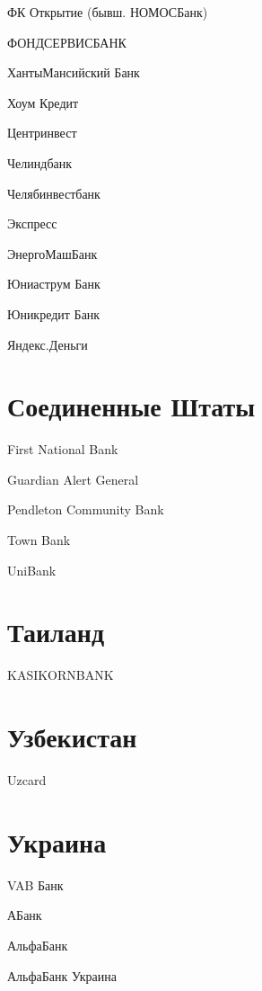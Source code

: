 \documentclass[a4paper,10pt,russian]{sphinxmanual}
\begin{document}
\sphinxAtStartPar
ФК Открытие (бывш. НОМОС\sphinxhyphen{}Банк)

\sphinxAtStartPar
ФОНДСЕРВИСБАНК

\sphinxAtStartPar
Ханты\sphinxhyphen{}Мансийский Банк

\sphinxAtStartPar
Хоум Кредит

\sphinxAtStartPar
Центр\sphinxhyphen{}инвест

\sphinxAtStartPar
Челиндбанк

\sphinxAtStartPar
Челябинвестбанк

\sphinxAtStartPar
Экспресс

\sphinxAtStartPar
ЭнергоМашБанк

\sphinxAtStartPar
Юниаструм Банк

\sphinxAtStartPar
Юникредит Банк

\sphinxAtStartPar
Яндекс.Деньги


\section{Соединенные Штаты}
\label{\detokenize{banks:id12}}
\sphinxAtStartPar
First National Bank

\sphinxAtStartPar
Guardian Alert General

\sphinxAtStartPar
Pendleton Community Bank

\sphinxAtStartPar
Town Bank

\sphinxAtStartPar
UniBank


\section{Таиланд}
\label{\detokenize{banks:id13}}
\sphinxAtStartPar
KASIKORNBANK


\section{Узбекистан}
\label{\detokenize{banks:id14}}
\sphinxAtStartPar
Uzcard


\section{Украина}
\label{\detokenize{banks:id15}}
\sphinxAtStartPar
VAB Банк

\sphinxAtStartPar
АБанк

\sphinxAtStartPar
Альфа\sphinxhyphen{}Банк

\sphinxAtStartPar
Альфа\sphinxhyphen{}Банк Украина
\end{document}

